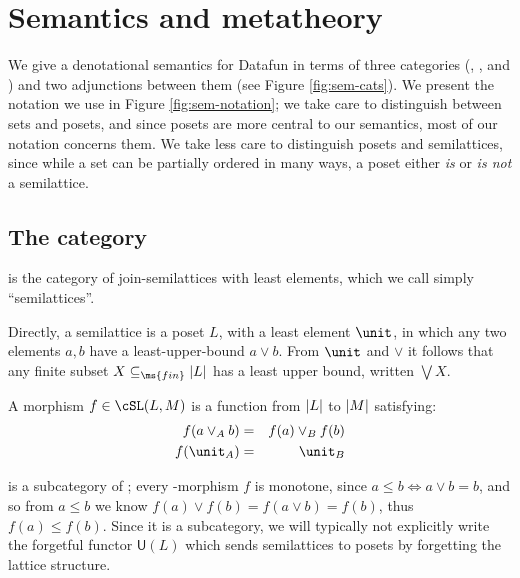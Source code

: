 
\section{Semantics and metatheory}
\label{sec:semantics}



We give a denotational semantics for Datafun in terms of three categories
(\cSet{}, \cPoset{}, and \cSL{}) and two adjunctions between them (see Figure
\ref{fig:sem-cats}). We present the notation we use in Figure
\ref{fig:sem-notation}; we take care to distinguish between sets and posets, and
since posets are more central to our semantics, most of our notation concerns
them. We take less care to distinguish posets and semilattices, since while a
set can be partially ordered in many ways, a poset either \emph{is} or \emph{is
  not} a semilattice.

\subsection{The category \cSL{}}

\cSL{} is the category of join-semilattices with least elements, which we call
simply ``semilattices''.

Directly, a semilattice is a poset $L$, with a least element $\unit$, in which
any two elements $a,b$ have a least-upper-bound $a \vee b$. From $\unit$ and
$\vee$ it follows that any finite subset $X \subseteq_{\ms{fin}} \U{L}$ has a
least upper bound, written $\bigvee X$.

A morphism $f \in \cSL(L, M)$ is a function from $|L|$ to $|M|$ satisfying:
\begin{eqnarray*}
  f(a \vee_A b) &=& f(a) \vee_B f(b)\\
  f(\unit_A) &=& \unit_B
\end{eqnarray*}

\cSL{} is a subcategory of ; every \cSL{}-morphism $f$ is monotone,
since $a \le b \iff a \vee b = b$, and so from $a \le b$ we know $f(a) \vee f(b)
= f(a \vee b) = f(b)$, thus $f(a) \le f(b)$. Since it is a subcategory, we will
typically not explicitly write the forgetful functor $\mathsf{U}(L)$ which sends
semilattices to posets by forgetting the lattice structure.

